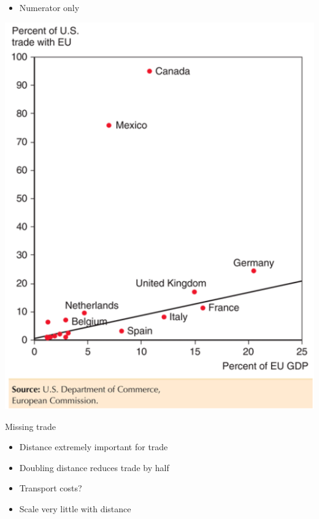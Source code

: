 \documentclass[ignorenonframetext,]{beamer}
\begin{document}
\begin{frame}

    \begin{itemize}
        \item Numerator only
    \end{itemize}
    \includegraphics[scale=0.40]{gravity_numerator_fit_nafta.png}

\end{frame}

\begin{frame}{Missing trade}

    \begin{itemize}
        \item Distance extremely important for trade
        \item Doubling distance reduces trade by half
        \item Transport costs?
        \item Scale very little with distance
    \end{itemize}

\end{frame}
\end{document}
